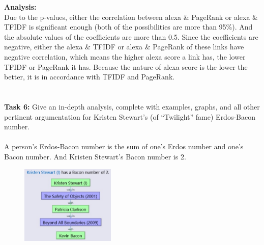 \documentclass{article}
\begin{document}
		\noindent\textbf{Analysis:}\\
		\indent Due to the p-values, either the correlation between alexa \& PageRank or alexa \& TFIDF is significant enough (both of the possibilities are more than 95\%). And the absolute values of the coefficients are more than 0.5. Since the coefficients are negative, either the alexa \& TFIDF or alexa \& PageRank of these links have negative correlation, which means the higher alexa score a link has, the lower TFIDF or PageRank it has. Because the nature of alexa score is the lower the better, it is in accordance with TFIDF and PageRank.\\\\\\
		\textbf{Task 6: }Give an in-depth analysis, complete with examples, graphs, and all other pertinent argumentation for Kristen Stewart's (of ``Twilight'' fame) Erdos-Bacon number.\\\\
		\indent A person's Erdos-Bacon number is the sum of one's Erdos number and one's Bacon number. And Kristen Stewart's Bacon number is 2.
		\begin{figure}[h]
			\centering 
			\includegraphics[width=0.4\textwidth]{BaconNumber.png}
			\label{fig:Bacon Number}
		\end{figure}
\end{document}

